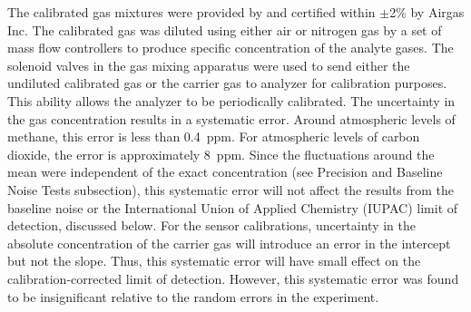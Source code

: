 \documentclass[times]{joehreview}
\begin{document}
	The calibrated gas mixtures were provided by and certified within $\pm$2\% by Airgas Inc.  The calibrated gas was diluted using either air or nitrogen gas by a set of mass flow controllers to produce specific concentration of the analyte gases.  The solenoid valves in the gas mixing apparatus were used to send either the undiluted calibrated gas or the carrier gas to analyzer for calibration purposes.  This ability allows the analyzer to be periodically calibrated.  The uncertainty in the gas concentration results in a systematic error.  Around atmospheric levels of methane, this error is less than 0.4~ppm.  For atmospheric levels of carbon dioxide, the error is approximately 8~ppm.  Since the fluctuations around the mean were independent of the exact concentration (see Precision and Baseline Noise Tests subsection), this systematic error will not affect the results from the baseline noise or the International Union of Applied Chemistry (IUPAC) limit of detection, discussed below.  For the sensor calibrations, uncertainty in the absolute concentration of the carrier gas will introduce an error in the intercept but not the slope.  Thus, this systematic error will have small effect on the calibration-corrected limit of detection.  However, this systematic error was found to be insignificant relative to the random errors in the experiment.  
	
\end{document}
